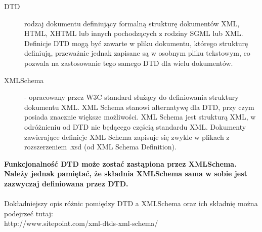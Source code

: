 \vspace{0.2cm}
\noindent
\begin{description}
\item[DTD] rodzaj dokumentu definiujący formalną strukturę dokumentów XML, HTML, XHTML lub innych
 pochodzących z rodziny SGML lub XML. Definicje DTD mogą być zawarte w pliku dokumentu, którego strukturę definiują, przeważnie jednak zapisane są w osobnym pliku tekstowym, co pozwala na zastosowanie tego samego DTD dla wielu dokumentów.\\

\item[XMLSchema] - opracowany przez W3C standard służący do definiowania struktury dokumentu XML. XML Schema stanowi alternatywę dla DTD, przy czym posiada znacznie większe możliwości. XML Schema jest strukturą XML, w odróżnieniu od DTD nie będącego częścią standardu XML. Dokumenty zawierające definicje XML Schema zapisuje się zwykle w plikach z rozszerzeniem .xsd (od XML Schema Definition).
\end{description}

\textbf{Funkcjonalność DTD może zostać zastąpiona przez XMLSchema. Należy jednak pamiętać, że składnia XMLSchema sama w sobie jest zazwyczaj definiowana przez DTD.}\\
\\
Dokładniejszy opis różnic pomiędzy DTD a XMLSchema oraz ich składnię można podejrzeć tutaj:\\
http://www.sitepoint.com/xml-dtds-xml-schema/

